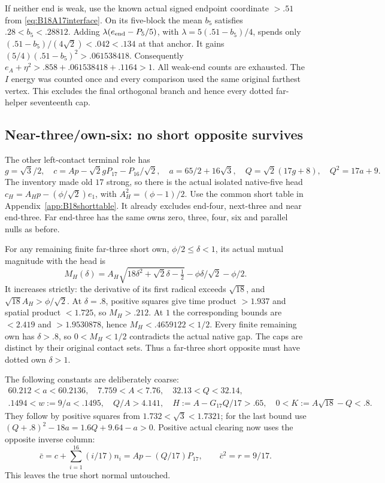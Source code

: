\documentclass[11pt]{article}
\theoremstyle{definition}
\theoremstyle{remark}
\begin{document}
If neither end is weak, use the known actual signed endpoint
coordinate \(>.51\) from \eqref{eq:B18A17interface}.
On its five-block the mean \(b_5\) satisfies \(.28<b_5<.28812\).
Adding \(\lambda(e_{\rm end}-P_5/5)\), with
\(\lambda=5(.51-b_5)/4\), spends only
\((.51-b_5)/(4\sqrt2)<.042<.134\) at that anchor.
It gains \((5/4)(.51-b_5)^2>.061538418\).
Consequently \(e_A+\eta^2>.858+.061538418+.1164>1\).
All weak-end counts are exhausted. The \(I\) energy was counted once
and every comparison used the same original farthest vertex.
This excludes the final orthogonal branch and hence every dotted
far-helper seventeenth cap.

\subsection{Near-three/own-six: no short opposite survives}
\label{app:B18near6}
The other left-contact terminal role has
\[
 g=\sqrt3/2,\quad
 c=Ap-\sqrt2gP_{17}-P_{16}/\sqrt2,\quad
 a=65/2+16\sqrt3,\quad Q=\sqrt2(17g+8),\quad Q^2=17a+9 .
\]
The inventory made old \(17\) strong, so there is the actual
isolated native-five head
\(c_H=A_Hp-(\phi/\sqrt2)e_1\), with
\(A_H^2=(\phi-1)/2\).
Use the common short table in Appendix~\ref{app:B18shorttable}.
It already excludes end-four, next-three and near end-three.
Far end-three has the same owns zero, three, four, six and parallel
nulls as before.

For any remaining finite far-three short own,
\(\phi/2\leq\delta<1\), its actual mutual magnitude with the head is
\[
 M_H(\delta)=A_H\sqrt{18\delta^2+\sqrt2\delta-\tfrac12}
             -\phi\delta/\sqrt2-\phi/2 .
\]
It increases strictly: the derivative of its first radical exceeds
\(\sqrt{18}\), and \(\sqrt{18}A_H>\phi/\sqrt2\).
At \(\delta=.8\), positive squares give time product \(>1.937\)
and spatial product \(<1.725\), so \(M_H>.212\).
At \(1\) the corresponding bounds are \(<2.419\) and
\(>1.9530878\), hence \(M_H<.4659122<1/2\).
Every finite remaining own has \(\delta>.8\), so
\(0<M_H<1/2\) contradicts the actual native gap.
The caps are distinct by their original contact sets.
Thus a far-three short opposite must have dotted own \(\delta>1\).

The following constants are deliberately coarse:
\[
\begin{gathered}
 60.212<a<60.2136,\quad 7.759<A<7.76,\quad32.13<Q<32.14,\\
 .1494<w:=9/a<.1495,\quad Q/A>4.141,\quad
 H:=A-G_{17}Q/17>.65,\quad
 0<K:=A\sqrt{18}-Q<.8 .
\end{gathered}
\]
They follow by positive squares from \(1.732<\sqrt3<1.7321\);
for the last bound use
\((Q+.8)^2-18a=1.6Q+9.64-a>0\).
Positive actual clearing now uses the opposite inverse column:
\[
 \bar c=c+\sum_{i=1}^{16}(i/17)n_i
       =Ap-(Q/17)P_{17},\qquad \bar c^2=r=9/17 .
\]
This leaves the true short normal untouched.
\end{document}
